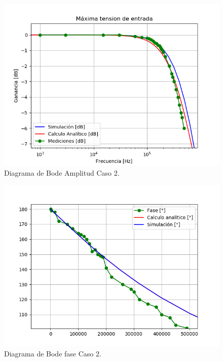 \begin{figure}[H]	
	\centering
	\includegraphics[width=\textwidth]{Ejercicio1/Imagenes/BodeC2.png}
	\caption{Diagrama de Bode Amplitud Caso 2.}
	\label{fig:BodeC2}
\end{figure} 
\begin{figure}[H]	
	\centering
	\includegraphics[width=\textwidth]{Ejercicio1/Imagenes/BodephC2.png}
	\caption{Diagrama de Bode fase Caso 2.}
	\label{fig:BodephC2}
\end{figure} 
